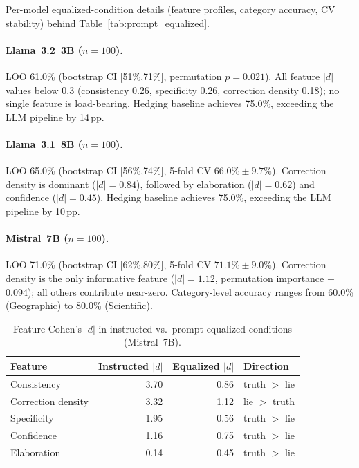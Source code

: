 Per-model equalized-condition details (feature profiles, category accuracy, CV stability) behind Table~\ref{tab:prompt_equalized}.

\paragraph{Llama~3.2~3B ($n=100$).}
LOO 61.0\% (bootstrap CI [51\%,71\%], permutation $p=0.021$). All feature $|d|$ values below 0.3 (consistency 0.26, specificity 0.26, correction density 0.18); no single feature is load-bearing. Hedging baseline achieves 75.0\%, exceeding the LLM pipeline by 14\,pp.

\paragraph{Llama~3.1~8B ($n=100$).}
LOO 65.0\% (bootstrap CI [56\%,74\%], 5-fold CV $66.0\% \pm 9.7\%$). Correction density is dominant ($|d|=0.84$), followed by elaboration ($|d|=0.62$) and confidence ($|d|=0.45$). Hedging baseline achieves 75.0\%, exceeding the LLM pipeline by 10\,pp.

\paragraph{Mistral~7B ($n=100$).}
LOO 71.0\% (bootstrap CI [62\%,80\%], 5-fold CV $71.1\% \pm 9.0\%$). Correction density is the only informative feature ($|d|=1.12$, permutation importance $+$0.094); all others contribute near-zero. Category-level accuracy ranges from 60.0\% (Geographic) to 80.0\% (Scientific).

\begin{table}[h]
\centering
\caption{Feature Cohen's $|d|$ in instructed vs.\ prompt-equalized conditions (Mistral~7B).}
\label{tab:equalized_feature_d}
\begin{tabular}{lrrl}
\toprule
\textbf{Feature} & \textbf{Instructed $|d|$} & \textbf{Equalized $|d|$} & \textbf{Direction} \\
\midrule
Consistency   & 3.70 & 0.86 & truth $>$ lie \\
Correction density & 3.32 & 1.12 & lie $>$ truth \\
Specificity   & 1.95 & 0.56 & truth $>$ lie \\
Confidence    & 1.16 & 0.75 & truth $>$ lie \\
Elaboration   & 0.14 & 0.45 & truth $>$ lie \\
\bottomrule
\end{tabular}
\end{table}

